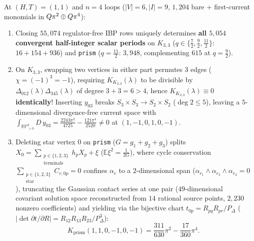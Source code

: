 \begin{theorem}[$5{,}054$ half-integer periods, $K_{K_{3,3}}\equiv 0$ parity vs.\ nonzero currents, and $3$-terminal $T=1$ locality~{\cite{Repo9e833c8}}]
\label{thm:t1-completion}
At $(H,T) = (1,1)$ and $n=4$ loops ($|V|=6, |I|=9$, $1{,}204$ bare + first-current monomials in $Q\pi^2\oplus Q\pi^4$):
\begin{enumerate}[label=(\arabic*),leftmargin=*]
  \item Closing $55{,}074$ regulator-free IBP rows uniquely determines \textbf{all $5{,}054$ convergent half-integer scalar periods} on $K_{3,3}$ ($q \in \{\frac{7}{2},\frac{9}{2},\frac{11}{2}\}$: $16+154+936$) and \texttt{prism} ($q = \frac{11}{2}$: $3{,}948$, complementing $615$ at $q=\frac{9}{2}$).

  \item On $K_{3,3}$, swapping two vertices in either part permutes $3$ edges ($\chi = (-1)^3 = -1$), requiring $K_{K_{3,3}}(\lambda)$ to be divisible by $\Delta_{012}(\lambda)\Delta_{345}(\lambda)$ of degree $3+3 = 6 > 4$, hence \textbf{$K_{K_{3,3}}(\lambda) \equiv 0$ identically}! Inserting $y_{03}$ breaks $S_3\times S_3 \to S_2\times S_2$ ($\deg 2 \le 5$), leaving a $5$-dimensional divergence-free current space with $\int_{\mathbb{RP}^8_{>0}}D\,y_{03} = \frac{2243\pi^2}{4725} - \frac{121\pi^4}{2520} \neq 0$ at $(1,-1,0,1,0,-1)$.

  \item Deleting star vertex $0$ on \texttt{prism} ($G = g_1+g_2+g_3$) splits $X_0 = \sum_{\substack{p\in\{1,2,3\}\\\mathrm{terminals}}}h_p X_p + \xi$ ($\mathbb{E}\xi^2 = \frac{1}{2G}$), where cycle conservation $\sum_{\substack{p\in\{1,2,3\}\\\mathrm{star}}}C_{r,0p} = 0$ confines $\alpha_r$ to a $2$-dimensional span ($\alpha_{r_1}\wedge\alpha_{r_2}\wedge\alpha_{r_3} = 0$), truncating the Gaussian contact series at one pair ($49$-dimensional covariant solution space reconstructed from $14$ rational source points, $2{,}230$ nonzero coefficients) and yielding via the bijective chart $t_{0p} = R_{pq}R_{pr}/P_\Delta$ ($|\det\partial t/\partial R| = R_{12}R_{13}R_{23}/P_\Delta^3$):
  \begin{equation}
  \label{eq:prism-t1-benchmark}
  K_{\mathrm{prism}}(1,1,0,-1,0,-1) = \frac{311}{630}\pi^2 - \frac{17}{360}\pi^4.
  \end{equation}
\end{enumerate}
\end{theorem}

